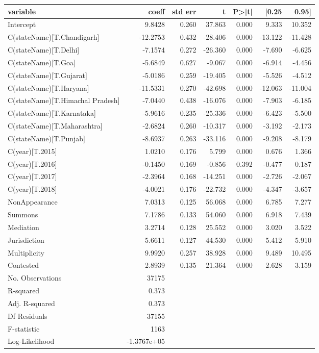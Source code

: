 {\footnotesize
 \begin{longtable}{@{}lrrrrrr@{}}
\label{tab:hearings_reg}\\
\toprule
variable & coeff & std err & t & P>|t| & [0.25 & 0.95] \\\midrule
\endhead
%
Intercept & 9.8428 & 0.260 & 37.863 & 0.000 & 9.333 & 10.352 \\
C(stateName)[T.Chandigarh] & -12.2753 & 0.432 & -28.406 & 0.000 & -13.122 & -11.428 \\
C(stateName)[T.Delhi] & -7.1574 & 0.272 & -26.360 & 0.000 & -7.690 & -6.625 \\
C(stateName)[T.Goa] & -5.6849 & 0.627 & -9.067 & 0.000 & -6.914 & -4.456 \\
C(stateName)[T.Gujarat] & -5.0186 & 0.259 & -19.405 & 0.000 & -5.526 & -4.512 \\
C(stateName)[T.Haryana] & -11.5331 & 0.270 & -42.698 & 0.000 & -12.063 & -11.004 \\
C(stateName)[T.Himachal Pradesh] & -7.0440 & 0.438 & -16.076 & 0.000 & -7.903 & -6.185 \\
C(stateName)[T.Karnataka] & -5.9616 & 0.235 & -25.336 & 0.000 & -6.423 & -5.500 \\
C(stateName)[T.Maharashtra] & -2.6824 & 0.260 & -10.317 & 0.000 & -3.192 & -2.173 \\
C(stateName)[T.Punjab] & -8.6937 & 0.263 & -33.116 & 0.000 & -9.208 & -8.179 \\
C(year)[T.2015] & 1.0210 & 0.176 & 5.799 & 0.000 & 0.676 & 1.366 \\
C(year)[T.2016] & -0.1450 & 0.169 & -0.856 & 0.392 & -0.477 & 0.187 \\
C(year)[T.2017] & -2.3964 & 0.168 & -14.251 & 0.000 & -2.726 & -2.067 \\
C(year)[T.2018] & -4.0021 & 0.176 & -22.732 & 0.000 & -4.347 & -3.657 \\
NonAppearance & 7.0313 & 0.125 & 56.068 & 0.000 & 6.785 & 7.277 \\
Summons & 7.1786 & 0.133 & 54.060 & 0.000 & 6.918 & 7.439 \\
Mediation & 3.2714 & 0.128 & 25.552 & 0.000 & 3.020 & 3.522 \\
Jurisdiction & 5.6611 & 0.127 & 44.530 & 0.000 & 5.412 & 5.910 \\
Multiplicity & 9.9920 & 0.257 & 38.928 & 0.000 & 9.489 & 10.495 \\
Contested & 2.8939 & 0.135 & 21.364 & 0.000 & 2.628 & 3.159\\
\bottomrule
No. Observations & 37175 & & & & &\\
R-squared & 0.373 & & & & & \\
Adj. R-squared& 0.373& & & & & \\
Df Residuals& 37155 & & & & &\\
F-statistic & 1163 & & & & & \\
Log-Likelihood & -1.3767e+05 & & & & & \\
\bottomrule
\end{longtable}}

